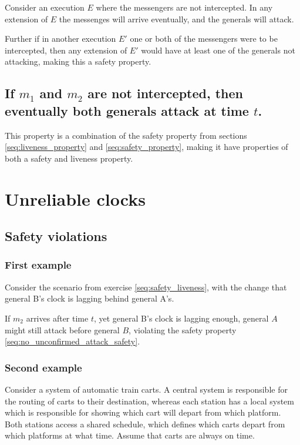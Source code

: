 \documentclass[a4paper]{scrreprt}
\begin{document}
Consider an execution $E$ where the messengers are not intercepted. In any
extension of $E$ the messenges will arrive eventually, and the generals will
attack.

Further if in another execution $E'$ one or both of the messengers were to be
intercepted, then any extension of $E'$ would have at least one of the generals
not attacking, making this a safety property.

\subsection{If $m_1$ and $m_2$ are not intercepted, then eventually both generals attack at time $t$.}

This property is a combination of the safety property from sections
\ref{seq:liveness_property} and \ref{seq:safety_property}, making it have
properties of both a safety and liveness property.

\section{Unreliable clocks}

\subsection{Safety violations}

\subsubsection{First example}

\label{seq:no_unonfirmed_attack_safety}

Consider the scenario from exercise \ref{seq:safety_liveness}, with the
change that general B's clock is lagging behind general A's.

If $m_2$ arrives after time $t$, yet general B's clock is lagging enough,
general $A$ might still attack before general $B$, violating the safety
property \ref{seq:no_unconfirmed_attack_safety}.

\subsubsection{Second example}

Consider a system of automatic train carts. A central system is responsible for
the routing of carts to their destination, whereas each station has a local
system which is responsible for showing which cart will depart from which
platform. Both stations access a shared schedule, which defines which carts
depart from which platforms at what time. Assume that carts are always on time.
\end{document}
